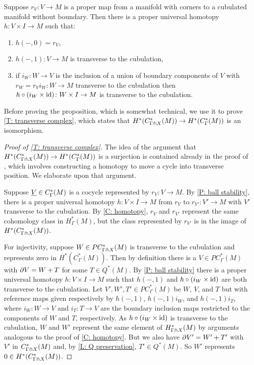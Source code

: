 \begin{proposition}\label{P: ball stability}
	Suppose $r_V \colon V \to M$ is a proper map from a manifold with corners to a cubulated manifold without boundary.
	Then there is a proper universal homotopy $h \colon V \times I \to M$ such that:
	\begin{enumerate}
		\item $h(-,0) = r_V$,
		\item $h(-,1) \colon V \to M$ is transverse to the cubulation,
		\item if $i_W \colon W \to V$ is the inclusion of a union of boundary components of $V$ with $r_W = r_Vi_W \colon W \to M$ transverse to the cubulation then $h \circ (i_{W} \times \mathrm{id}) \colon W \times I \to M$ is transverse to the cubulation.
	\end{enumerate}
\end{proposition}

Before proving the proposition, which is somewhat technical, we use it to prove \cref{T: transverse complex}, which states that $H^*(C^*_{\Gamma \pitchfork X}(M)) \to H^*(C_\Gamma^*(M))$ is an isomorphism.

\begin{proof}[Proof of \cref{T: transverse complex}]
	The idea of the argument that $H^*(C^*_{\Gamma \pitchfork X}(M)) \to H^*(C_\Gamma^*(M))$ is a surjection is contained already in the proof of \cite[Lemma 15]{Lipy14}, which involves constructing a homotopy to move a cycle into transverse position.
	We elaborate upon that argument.

	Suppose $\underline{V} \in C_\Gamma^*(M)$ is a cocycle represented by $r_V \colon V \to M$.
	By \cref{P: ball stability}, there is a proper universal homotopy $h \colon V \times I \to M$ from $r_V$ to $r_{V'} \colon V' \to M$ with $V'$ transverse to the cubulation.
	By \cref{C: homotopy}, $r_V$ and $r_{V'}$ represent the same cohomology class in $H^*_{\Gamma}(M)$, but the class represented by $r_{V'}$ is in the image of $H^*(C^*_{\Gamma \pitchfork X}(M))$.

	For injectivity, suppose $W \in PC^*_{\Gamma \pitchfork X}(M)$ is transverse to the cubulation and represents zero in $H^*(C_\Gamma^*(M))$.
	Then by definition there is a $V \in PC^*_\Gamma(M)$ with $\partial V = W+T$ for some
	$T \in Q^*(M)$.
	By \cref{P: ball stability} there is a proper universal homotopy $h \colon V \times I \to M$ such that $h(-,1)$ and $h \circ (i_{W} \times \mathrm{id})$ are both transverse to the cubulation.
	Let $V', W',T' \in PC^*_\Gamma(M)$ be $W$, $V$, and $T$ but with reference maps given respectively by $h(-,1)$, $h(-,1)i_W$, and $h(-,1)i_T$, where $i_W \colon W \to V$ and $i_T \colon T \to V$ are the boundary inclusion maps restricted to the components of $W$ and $T$, respectively.
	As $h \circ (i_{W} \times \mathrm{id})$ is transverse to the cubulation, $W$ and $W'$ represent the same element of $H^*_{\Gamma \pitchfork X}(M)$ by arguments analogous to the proof of \cref{C: homotopy}.
	But we also have $\partial V' = W'+T'$ with $V'$ in $C^*_{\Gamma \pitchfork X}(M)$ and, by \cref{L: Q preservation}, $T' \in Q^*(M)$.
	So $W'$ represents $0 \in H^*(C^*_{\Gamma \pitchfork X}(M))$.
\end{proof}

